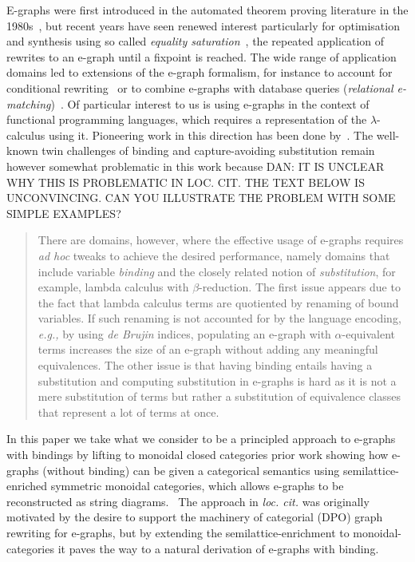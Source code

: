 \documentclass[peerreviewcls]{IEEEtran}
\begin{document}
E-graphs were first introduced in the automated theorem proving literature in the 1980s~\cite{nelson1980techniques}, but recent years have seen renewed interest particularly for optimisation and synthesis using so called \emph{equality saturation}~\cite{10.1145/1594834.1480915, griggio_proceedings_2022, EggPaper,flatt_small_2022}, the repeated application of rewrites to an e-graph until a fixpoint is reached. 
The wide range of application domains led to extensions of the e-graph formalism, for instance to account for conditional rewriting~\cite{singher2023colored} or  to combine e-graphs with database queries (\emph{relational e-matching})~\cite{zhang_relational_2022}.
Of particular interest to us is using e-graphs in the context of functional programming languages, which requires a representation of the $\lambda$-calculus using it. 
Pioneering work in this direction has been done by~\cite{koehler2022sketchguided}.
The well-known twin challenges of binding and capture-avoiding substitution remain however somewhat problematic in this work because DAN: IT IS UNCLEAR WHY THIS IS PROBLEMATIC IN LOC. CIT. THE TEXT BELOW IS UNCONVINCING. CAN YOU ILLUSTRATE THE PROBLEM WITH SOME SIMPLE EXAMPLES? 
\begin{quotation}
There are domains, however, where the effective usage of e-graphs requires \textit{ad hoc} tweaks to achieve the desired performance, namely domains that include variable \textit{binding} and the closely related notion of \textit{substitution}, for example, lambda calculus with $\beta$-reduction.
The first issue appears due to the fact that lambda calculus terms are quotiented by renaming of bound variables.
If such renaming is not accounted for by the language encoding, \textit{e.g.,} by using \textit{de Brujin} indices, populating an e-graph with $\alpha$-equivalent terms increases the size of an e-graph without adding any meaningful equivalences.
The other issue is that having binding entails having a substitution and computing substitution in e-graphs is hard as it is not a mere substitution of terms but rather a substitution of equivalence classes that represent a lot of terms at once.
\end{quotation}

In this paper we take what we consider to be a principled approach to e-graphs with bindings by lifting to monoidal closed categories prior work showing how e-graphs (without binding) can be given a categorical semantics using semilattice-enriched symmetric monoidal categories, which allows e-graphs to be reconstructed as string diagrams.~\cite{ghica2024equivalencehypergraphsegraphsmonoidal}  
The approach in \emph{loc. cit.} was originally motivated by the desire to support the machinery of categorial (DPO) graph rewriting for e-graphs, but by extending the semilattice-enrichment to monoidal-categories it paves the way to a natural derivation of e-graphs with binding. 
\end{document}
